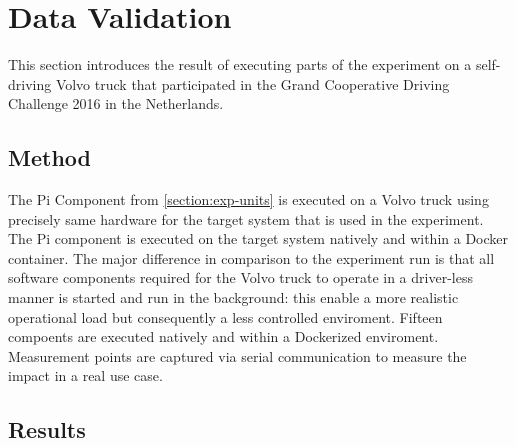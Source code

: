 \iffalse  \fi
\chapter{Data Validation}\label{section:data-validation}

This section introduces the result of executing parts of the experiment on a self-driving Volvo truck that participated in the Grand Cooperative Driving Challenge 2016 in the Netherlands. 

\section{Method}
The Pi Component from \ref{section:exp-units} is executed on a Volvo truck using precisely same hardware for the target system that is used in the experiment. The Pi component is executed on the target system natively and within a Docker container. The major difference in comparison to the experiment run is that all software components required for the Volvo truck to operate in a driver-less manner is started and run in the background: this enable a more realistic operational load but consequently a less controlled enviroment. Fifteen compoents are executed natively and within a Dockerized enviroment. Measurement points are captured via serial communication to measure the impact in a real use case. 

\section{Results}